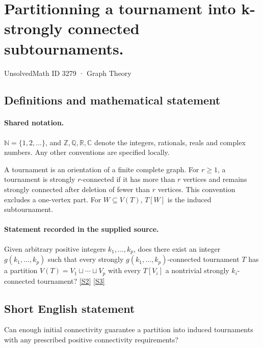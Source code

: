 \documentclass[11pt]{article}
\newcommand{\sref}[2]{\hyperlink{source:#1:#2}{[S#2]}}
\begin{document}
\setcounter{section}{3278}
\section{Partitionning a tournament into k-strongly connected subtournaments.}\label{3279}
{\small\sffamily UnsolvedMath ID 3279 · Graph Theory}
\subsection{Definitions and mathematical statement}

\paragraph{Shared notation.}$\mathbb N=\{1,2,\ldots\}$, and $\mathbb Z,\mathbb Q,\mathbb R,\mathbb C$ denote the integers, rationals, reals and complex numbers. Any other conventions are specified locally.


A tournament is an orientation of a finite complete graph. For $r\geq1$, a tournament is strongly $r$-connected if it has more than $r$ vertices and remains strongly connected after deletion of fewer than $r$ vertices. This convention excludes a one-vertex part. For $W\subseteq V(T)$, $T[W]$ is the induced subtournament.
\paragraph{Statement recorded in the supplied source.}
Given arbitrary positive integers $k_1,\ldots,k_p$, does there exist an integer $g(k_1,\ldots,k_p)$ such that every strongly $g(k_1,\ldots,k_p)$-connected tournament $T$ has a partition $V(T)=V_1\sqcup\cdots\sqcup V_p$ with every $T[V_i]$ a nontrivial strongly $k_i$-connected tournament? \sref{3279}{2} \sref{3279}{3}
\subsection{Short English statement}
Can enough initial connectivity guarantee a partition into induced tournaments with any prescribed positive connectivity requirements?
\end{document}

